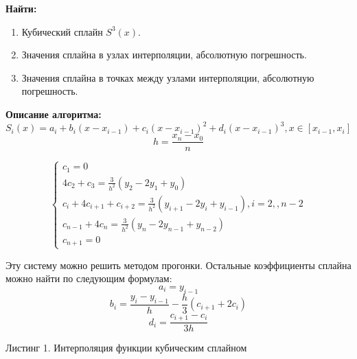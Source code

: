 \documentclass [12pt]{article}
\begin{document}
\textbf{Найти:}

\begin{enumerate}
    \item Кубический сплайн $S^3(x)$.
    \item Значения сплайна в узлах интерполяции, абсолютную погрешность.
    \item Значения сплайна в точках между узлами интерполяции, абсолютную погрешность.
\end{enumerate}

\textbf{Описание алгоритма:}\\

$$ S_i(x) = a_i + b_i(x - x_{i-1}) + c_i(x - x_{i - 1}) ^ 2 + d_i(x - x_{i - 1})^3, x \in [x_{i - 1}, x_i]$$
$$h=\frac{x_n - x_0}{n}$$

\begin{equation*}
\begin{cases}
c_1 = 0\\
4c_2 + c_3 = \frac{3}{h^2}(y_2 - 2y_1 + y_0)\\
c_i + 4c_{i+1}+c_{i+2} = \frac{3}{h^2}(y_{i+1}-2y_i+y_{i-1}), i = 2, , n - 2\\
c_{n - 1} + 4c_n =\frac{3}{h^2}(y_n - 2y_{n - 1} + y_{n - 2})\\
c_{n + 1} = 0
\end{cases}
\end{equation*}

Эту систему можно решить методом прогонки. Остальные коэффициенты сплайна можно найти по следующим формулам:
$$a_i = y_{i - 1}$$
$$b_i=\frac{y_i - y_{i - 1}}{h} - \frac{h}{3}(c_{i + 1} + 2c_i)$$
$$d_i=\frac{c_{i + 1} - c_i}{3h}$$

Листинг 1. Интерполяция функции кубическим сплайном
\end{document}
